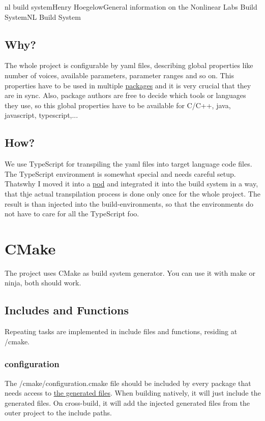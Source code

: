 \documentclass[11pt]{article}
\begin{document}
\begin{Name}{1}{nl build system}{Henry Hoegelow}{General information on the Nonlinear Labs Build System}{NL Build System}
\subsection{Why?} \label{whygenerated}
The whole project is configurable by yaml files, describing global properties like number of voices, available parameters, parameter ranges and so on. This properties have to be used in multiple \hyperref[packages]{packages} and it is very crucial that they are in sync. Also, package authors are free to decide which tools or languages they use, so this global properties have to be available for C/C++, java, javascript, typescript,...

\subsection{How?}
We use TypeScript for transpiling the yaml files into target language code files. The TypeScript environment is somewhat special and needs careful setup. Thatswhy I moved it into a \hyperref[pod]{pod} and integrated it into the build system in a way, that thje actual transpilation process is done only once for the whole project. The result is than injected into the build-environments, so that the environments do not have to care for all the TypeScript foo.

\section{CMake}
The project uses CMake as build system generator. You can use it with make or ninja, both should work.

\subsection{Includes and Functions}
Repeating tasks are implemented in include files and functions, residing at /cmake.

\subsubsection{configuration}
The /cmake/configuration.cmake file should be included by every package that needs access to \hyperref[whygenerated]{the generated files}. When building natively, it will just include the generated files. On cross-build, it will add the injected generated files from the outer project to the include paths.


\end{Name}
\end{document}
